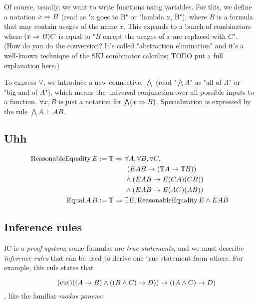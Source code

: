 \documentclass{article}
\begin{document}
  Of course, usually, we want to write functions using variables. For this, we define a notation $x \Rightarrow B$ (read as "x goes to B" or "lambda x, B"), where $B$ is a formula that may contain usages of the name $x$. This expands to a bunch of combinators where $(x \Rightarrow B) C$ is equal to "$B$ except the usages of $x$ are replaced with $C$". (How do you do the conversion? It's called "abstraction elimination" and it's a well-known technique of the SKI combinator calculus; TODO put a full explanation here.)
  
  To express $\forall$, we introduce a new connective, $\bigwedge$ (read "$\bigwedge A$" as "all of $A$" or "big-and of $A$"), which means the universal conjunction over all possible inputs to a function. $\forall x, B$ is just a notation for $\bigwedge (x \Rightarrow B)$. Specialization is expressed by the rule $\bigwedge A\,\vdash AB$.
    
  \subsection{Uhh}
  
  \begin{align*}
    \mathrm{ReasonableEquality}\,E := \nameabst{\mathbb{T}}\ &\forall A, \forall B, \forall C,\\
      &\ (EAB \to (\mathbb{T}A \to \mathbb{T}B))\\
      &\wedge (EAB \to E(CA)(CB))\\
      &\wedge (EAB \to E(AC)(AB))\\
    \mathrm{Equal}\,A\,B := \nameabst{\mathbb{T}}\ &\exists E, \mathrm{ReasonableEquality}\,E \wedge EAB
  \end{align*}
  
  \subsection{Inference rules}
  
  IC is a \emph{proof system}; some formulas are \emph{true statements}, and we must describe \emph{inference rules} that can be used to derive one true statement from others. For example, this rule states that
  
  \begin{equation*}
    \tag{cut}
    ((A \to B) \wedge ((B \wedge C) \to D)) \to ((A \wedge C) \to D)\\
  \end{equation*}
  , like the familiar \emph{modus ponens}:
  
\end{document}
